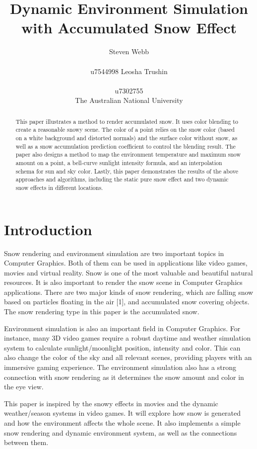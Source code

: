 \documentclass{article}
\title{Dynamic Environment Simulation with Accumulated Snow Effect}
\author{%
  Steven Webb\\\\
  u7544998 
   \And
  Leosha Trushin\\\\
  u7302755\\
  \AND  The Australian National University 
}
\begin{document}
\maketitle

\begin{abstract}
This paper illustrates a method to render accumulated snow. It uses color blending to create a reasonable snowy scene. The color of 
a point relies on the snow color (based on a white background and distorted normals) and the surface color without snow, as well as a
snow accumulation prediction coefficient to control the blending result. The paper also designs a method to map the environment 
temperature and maximum snow amount on a point, a bell-curve sunlight intensity formula, and an interpolation schema for sun and sky 
color. Lastly, this paper demonstrates the results of the above approaches and algorithms, including the static pure snow effect and 
two dynamic snow effects in different locations.
\end{abstract}

\section{Introduction}
Snow rendering and environment simulation are two important topics in Computer Graphics. Both of them can be used in applications like 
video games, movies and virtual reality. Snow is one of the most valuable and beautiful natural resources. It is also important to 
render the snow scene in Computer Graphics applications. There are two major kinds of snow rendering, which are falling snow based on 
particles floating in the air [1], and accumulated snow covering objects. The snow rendering type in this paper is the accumulated snow.

Environment simulation is also an important field in Computer Graphics. For instance, many 3D video games require a robust daytime
and weather simulation system to calculate sunlight/moonlight position, intensity and color. This can also change the color of the sky 
and all relevant scenes, providing players with an immersive gaming experience. The environment simulation also has a strong connection 
with snow rendering as it determines the snow amount and color in the eye view. 

This paper is inspired by the snowy effects in movies and the dynamic weather/season systems in video games. It will explore how snow is 
generated and how the environment affects the whole scene. It also implements a simple snow rendering and dynamic environment system, as 
well as the connections between them.
\end{document}
